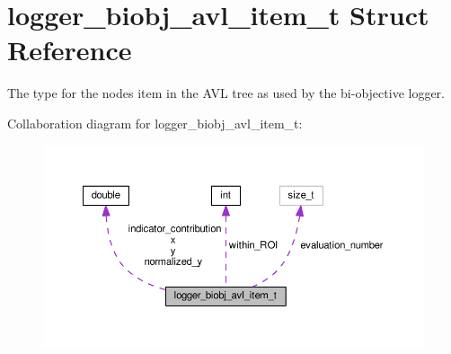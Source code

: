 \hypertarget{structlogger__biobj__avl__item__t}{}\section{logger\+\_\+biobj\+\_\+avl\+\_\+item\+\_\+t Struct Reference}
\label{structlogger__biobj__avl__item__t}


The type for the node\textquotesingle{}s item in the A\+VL tree as used by the bi-\/objective logger.  




Collaboration diagram for logger\+\_\+biobj\+\_\+avl\+\_\+item\+\_\+t\+:\nopagebreak
\begin{figure}[H]
\begin{center}
\leavevmode
\includegraphics[width=350pt]{structlogger__biobj__avl__item__t__coll__graph}
\end{center}
\end{figure}
